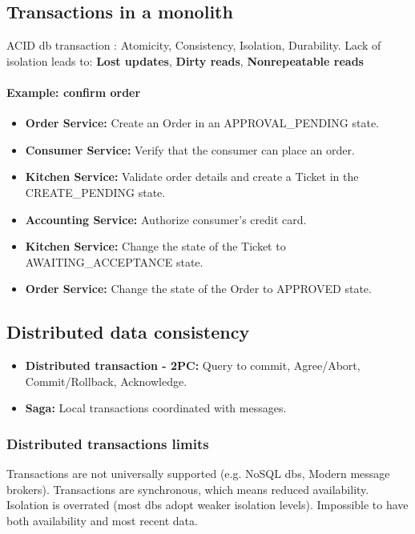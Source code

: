 \subsection{Transactions in a monolith}
ACID db transaction : Atomicity, Consistency, Isolation, Durability.
Lack of isolation leads to: \textbf{Lost updates}, \textbf{Dirty reads}, \textbf{Nonrepeatable reads}


\paragraph{Example: confirm order}
\begin{itemize}
  \item \textbf{Order Service:} Create an Order in an APPROVAL\_PENDING state.
  \item \textbf{Consumer Service:} Verify that the consumer can place an order.
  \item \textbf{Kitchen Service:} Validate order details and create a Ticket in the CREATE\_PENDING state.
  \item \textbf{Accounting Service:} Authorize consumer's credit card.
  \item \textbf{Kitchen Service:} Change the state of the Ticket to AWAITING\_ACCEPTANCE state.
  \item \textbf{Order Service:} Change the state of the Order to APPROVED state.
\end{itemize}

\subsection{Distributed data consistency}
\begin{itemize}
  \item \textbf{Distributed transaction - 2PC:} Query to commit, Agree/Abort, Commit/Rollback, Acknowledge.
  \item \textbf{Saga:} Local transactions coordinated with messages.
\end{itemize}

\subsubsection{Distributed transactions limits}
Transactions are not universally supported (e.g. NoSQL dbs, Modern message brokers). Transactions are synchronous, which means reduced availability. Isolation is overrated (most dbs adopt weaker isolation levels). Impossible to have both availability and most recent data.


